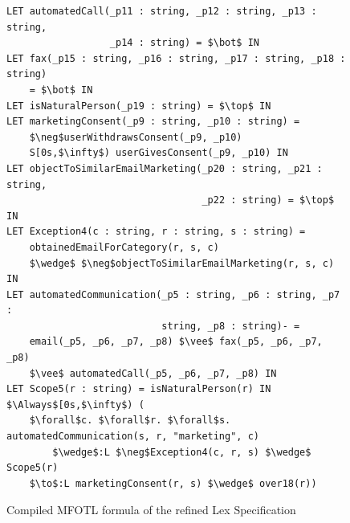 \begin{figure}[H]
    \begin{lstlisting}[mathescape]
LET automatedCall(_p11 : string, _p12 : string, _p13 : string,
                  _p14 : string) = $\bot$ IN
LET fax(_p15 : string, _p16 : string, _p17 : string, _p18 : string)
    = $\bot$ IN
LET isNaturalPerson(_p19 : string) = $\top$ IN
LET marketingConsent(_p9 : string, _p10 : string) =
    $\neg$userWithdrawsConsent(_p9, _p10)
    S[0s,$\infty$) userGivesConsent(_p9, _p10) IN
LET objectToSimilarEmailMarketing(_p20 : string, _p21 : string,
                                  _p22 : string) = $\top$ IN
LET Exception4(c : string, r : string, s : string) =
    obtainedEmailForCategory(r, s, c)
    $\wedge$ $\neg$objectToSimilarEmailMarketing(r, s, c) IN
LET automatedCommunication(_p5 : string, _p6 : string, _p7 :
                           string, _p8 : string)- =
    email(_p5, _p6, _p7, _p8) $\vee$ fax(_p5, _p6, _p7, _p8)
    $\vee$ automatedCall(_p5, _p6, _p7, _p8) IN
LET Scope5(r : string) = isNaturalPerson(r) IN
$\Always$[0s,$\infty$) (
    $\forall$c. $\forall$r. $\forall$s. automatedCommunication(s, r, "marketing", c)
        $\wedge$:L $\neg$Exception4(c, r, s) $\wedge$ Scope5(r)
    $\to$:L marketingConsent(r, s) $\wedge$ over18(r)) \end{lstlisting}
    \caption{Compiled MFOTL formula of the refined Lex Specification
    \label{fig:rex-article-13-compiled-mfotl}}
\end{figure}